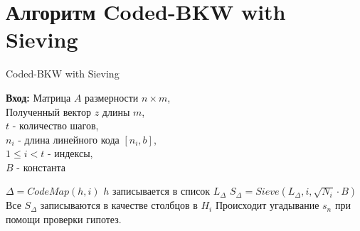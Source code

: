 \documentclass[a4paper,11pt]{article}
\begin{document}
\section{Алгоритм Coded-BKW with Sieving}

	
	
	\begin{algorithm}[ph]
		\caption{Coded-BKW with Sieving}
		\label{alg:AlgName}
		\textbf{Вход:}  Матрица $A$ размерности $n \times m$, \\
		Полученный вектор $z$ длины $m$, \\
		$t$ - количество шагов,\\
		$n_i$ - длина линейного кода $[n_i,b]$,\\
		$1 \leq i < t$ - индексы,\\
		$B$ - константа\\
		
		\begin{algorithmic}[1]
			
					\State $\Delta=CodeMap(h,i)$
					\State $h$ записывается в список $L_{\Delta}$
				\EndFor
					\State $S_{\Delta} = Sieve(L_{\Delta}, i, \sqrt{N_i}\cdot B)$
					\State Все $S_{\Delta}$ записываются в качестве столбцов в $H_i$
				\EndFor
			\EndFor
			\State Происходит угадывание $s_n$ при помощи проверки гипотез.
		\end{algorithmic}
		
	\end{algorithm}
	
\end{document}
